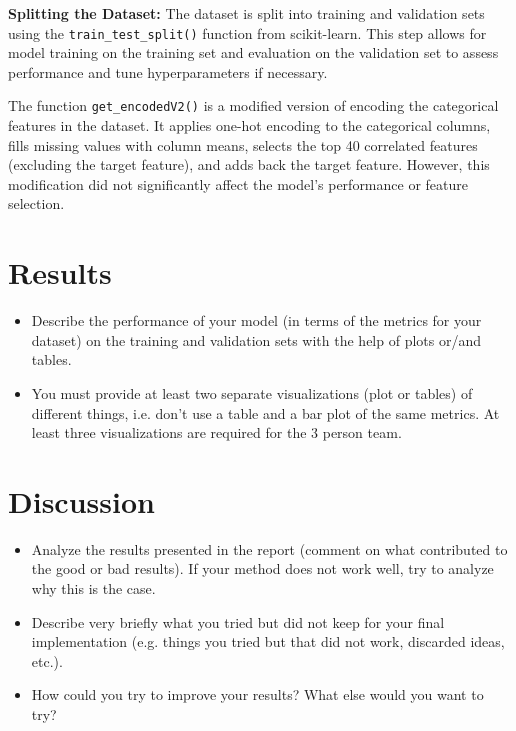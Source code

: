 \documentclass[a4, 10 pt, conference]{ieeeconf}  %
\begin{document}
\textbf{Splitting the Dataset:} The dataset is split into training and validation sets using the \texttt{train\_test\_split()} function from scikit-learn. This step allows for model training on the training set and evaluation on the validation set to assess performance and tune hyperparameters if necessary.

The function \texttt{get\_encodedV2()} is a modified version of encoding the categorical features in the dataset. It applies one-hot encoding to the categorical columns, fills missing values with column means, selects the top 40 correlated features (excluding the target feature), and adds back the target feature. However, this modification did not significantly affect the model's performance or feature selection.

\section{Results}
\label{sec:results}

{\color{blue}

  \begin{itemize}
    \item Describe the performance of your model (in terms of the metrics for your dataset) on the training and validation sets with the help of plots or/and tables.
    \item You must provide at least two separate visualizations
          (plot or tables) of different things, i.e. don’t use a table
          and a bar plot of the same metrics. At least three
          visualizations are required for the 3 person team.
  \end{itemize}
}

\section{Discussion}
\label{sec:discuss}

{\color{blue}
  \begin{itemize}
    \item Analyze the results presented in the report (comment on what contributed to the good or bad results). If your method does not work well, try to analyze why this is the case.
    \item Describe very briefly what you tried but did not keep for your final implementation (e.g. things you tried but that did not work, discarded ideas, etc.).
    \item How could you try to improve your results? What else would you want to try?

  \end{itemize}
}
\end{document}
